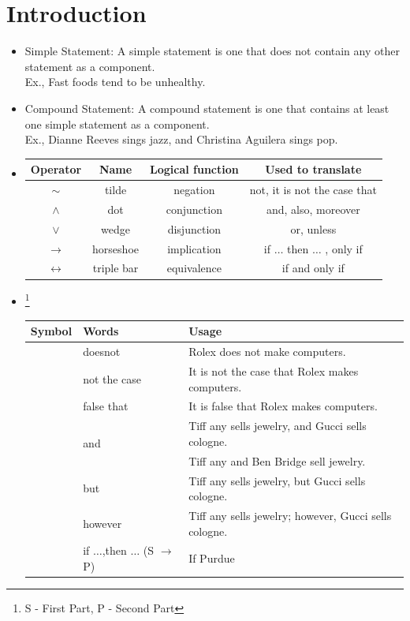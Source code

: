 \documentclass[a4paper,oneside]{book}
\begin{document}
\section{Introduction}
\begin{itemize}
  \item Simple Statement: A simple statement is one that does not contain any
  other statement as a component.\\Ex., Fast foods tend to be unhealthy.
  \item Compound Statement: A compound statement is one that contains at least one simple statement as a
component.\\Ex., Dianne Reeves sings jazz, and Christina Aguilera sings pop.
  \item \begin{tabular}[H]{cccc}
  Operator & Name & Logical function & Used to translate \\ \hline
$\sim$ & tilde & negation & not, it is not the case that \\
$\wedge$ & dot & conjunction & and, also, moreover \\
$\lor$ & wedge & disjunction & or, unless \\
$\to$ & horseshoe & implication & if $\ldots$ then $\ldots$ , only if \\
$\leftrightarrow$ & triple bar & equivalence & if and only if\\
  \end{tabular}
  \item \footnote{S - First Part, P -
  Second
  Part}\begin{tabular}[H]{|>{\centering\arraybackslash}p{1.5cm}p{4.5cm}p{10cm}|}
  \hline
  Symbol & Words & Usage \\ \hline
  \multirow{3}{*}{$\sim$} & doesnot & Rolex does not make computers.\\
  & not the case & It is not the case that Rolex makes computers. \\
  & false that & It is false that Rolex makes computers.\\ \hline
  \multirow{4}{*}{$\wedge$} & \multirow{2}{*}{and} & Tiff any sells jewelry, and Gucci sells cologne. \\
  & & Tiff any and Ben Bridge sell jewelry.\\
  & but & Tiff any sells jewelry, but Gucci sells cologne. \\
  & however & Tiff any sells jewelry; however, Gucci sells cologne. \\ \hline
  \multirow{6}{*}{$\to$} & if $\ldots$,then $\ldots$ (S $\to$ P) & If Purdue

\end{tabular}
\end{itemize}
\end{document}
